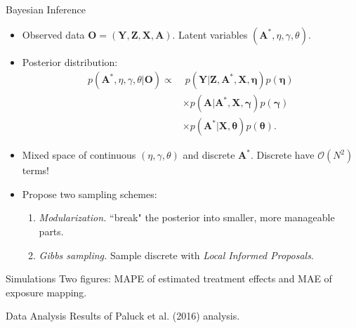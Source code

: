 \documentclass{beamer}
\def \bZ {\textbf{Z}}
\def \bA {\textbf{A}}
\def \bX {\textbf{X}}
\def \bY {\textbf{Y}}
\def \bO {\textbf{O}}
\def \boeta {\boldsymbol{\eta}}
\def \bgamma {\boldsymbol{\gamma}}
\def \btheta {\boldsymbol{\theta}}
\begin{document}
    \begin{frame}{Bayesian Inference}
        \large
        \begin{itemize}
            \item<1-> Observed data $\bO = (\bY,\bZ,\bX,\bA)$. Latent variables $(\bA^\ast, \eta,\gamma,\theta)$.
            \vspace{0.2cm}
            \item<2-> Posterior distribution:
            \begin{equation*}
                \begin{split}
                    p(\bA^\ast, \eta,\gamma,\theta \vert \bO) 
                        \propto
                    &\;
                    p(\bY \vert \bZ,\bA^\ast,\bX,\boeta) p(\boeta) 
                    \\ & \times
                    p(\bA \vert \bA^\ast, \bX,\bgamma) p(\bgamma)
                    \\ & \times 
                    p(\bA^\ast \vert \bX,\btheta) p(\btheta).
                \end{split}
            \end{equation*} 
            \item<3-> Mixed space of continuous $(\eta,\gamma,\theta)$ and discrete $\bA^\ast$. Discrete have $\mathcal{O}(N^2)$ terms!
            \item<4-> Propose two sampling schemes:
            \begin{enumerate}
                \item \emph{Modularization.} ``break" the posterior into smaller, more manageable parts.
                \vspace{0.1cm}
                \item \emph{Gibbs sampling.} Sample discrete with \emph{Local Informed Proposals}.
            \end{enumerate} 
        \end{itemize}
    \end{frame}

    \begin{frame}{Simulations}
        Two figures: MAPE of estimated treatment effects and MAE of exposure mapping.        
    \end{frame}

    \begin{frame}{Data Analysis}
        Results of Paluck et al. (2016) analysis.
    \end{frame}
\end{document}
